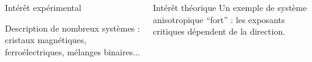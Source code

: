 \documentclass[xcolor=dvipsnames]{beamer}
\begin{document}
\begin{frame}


\end{frame}

\begin{frame}

\begin{columns}

\begin{column}{5cm}
\begin{block}{Intérêt expérimental}

Description de nombreux systèmes : cristaux magnétiques, ferroélectriques, mélanges binaires...

\end{block}
\end{column}

\begin{column}{5cm}
\begin{block}{Intérêt théorique}
Un exemple de système anisotropique ``fort'' : les exposants critiques dépendent de la direction.
\end{block}
\end{column}

\end{columns}

\end{frame}
\end{document}
